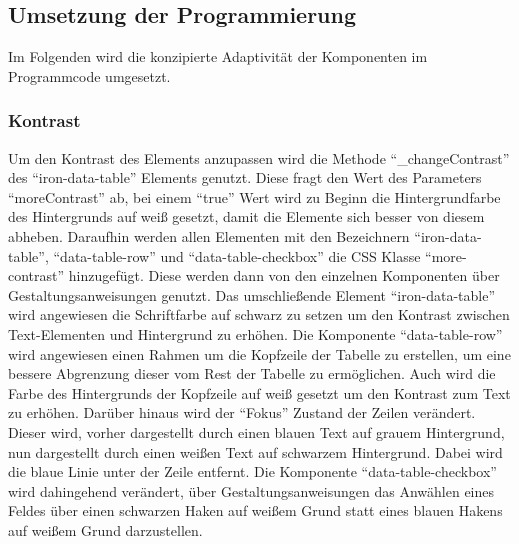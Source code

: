 \documentclass[12pt, paper=a4, bibtotoc, toc=listof, headsepline=true, numbers=endperiod]{scrreprt}
\begin{document}
	\subsection{Umsetzung der Programmierung}
	Im Folgenden wird die konzipierte Adaptivität der Komponenten im Programmcode umgesetzt.
	\subsubsection{Kontrast}
	Um den Kontrast des Elements anzupassen wird die Methode \enquote{\_changeContrast} des \enquote{iron-data-table} Elements genutzt. Diese fragt den Wert des Parameters \enquote{moreContrast} ab, bei einem \enquote{true} Wert wird zu Beginn die Hintergrundfarbe des Hintergrunds auf weiß gesetzt, damit die Elemente sich besser von diesem abheben. Daraufhin werden allen Elementen mit den Bezeichnern \enquote{iron-data-table}, \enquote{data-table-row} und \enquote{data-table-checkbox} die CSS Klasse \enquote{more-contrast} hinzugefügt. Diese werden dann von den einzelnen Komponenten über Gestaltungsanweisungen genutzt. Das umschließende Element \enquote{iron-data-table} wird angewiesen die Schriftfarbe auf schwarz zu setzen um den Kontrast zwischen Text-Elementen und Hintergrund zu erhöhen. Die Komponente \enquote{data-table-row} wird angewiesen einen Rahmen um die Kopfzeile der Tabelle zu erstellen, um eine bessere Abgrenzung dieser vom Rest der Tabelle zu ermöglichen. Auch wird die Farbe des Hintergrunds der Kopfzeile auf weiß gesetzt um den Kontrast zum Text zu erhöhen. Darüber hinaus wird der \enquote{Fokus} Zustand der Zeilen verändert. Dieser wird, vorher dargestellt durch einen blauen Text auf grauem Hintergrund, nun dargestellt durch einen weißen Text auf schwarzem Hintergrund. Dabei wird die blaue Linie unter der Zeile entfernt. Die Komponente \enquote{data-table-checkbox} wird dahingehend verändert, über Gestaltungsanweisungen das Anwählen eines Feldes über einen schwarzen Haken auf weißem Grund statt eines blauen Hakens auf weißem Grund darzustellen.
\end{document}
